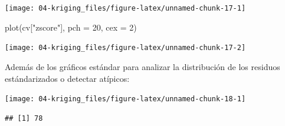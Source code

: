\documentclass[
  spanish,
]{book}
\newenvironment{Shaded}{\begin{snugshade}}{\end{snugshade}}
\newcommand{\AttributeTok}[1]{\textcolor[rgb]{0.77,0.63,0.00}{#1}}
\newcommand{\CommentTok}[1]{\textcolor[rgb]{0.56,0.35,0.01}{\textit{#1}}}
\newcommand{\ConstantTok}[1]{\textcolor[rgb]{0.00,0.00,0.00}{#1}}
\newcommand{\DecValTok}[1]{\textcolor[rgb]{0.00,0.00,0.81}{#1}}
\newcommand{\FunctionTok}[1]{\textcolor[rgb]{0.00,0.00,0.00}{#1}}
\newcommand{\NormalTok}[1]{#1}
\newcommand{\OtherTok}[1]{\textcolor[rgb]{0.56,0.35,0.01}{#1}}
\newcommand{\SpecialCharTok}[1]{\textcolor[rgb]{0.00,0.00,0.00}{#1}}
\newcommand{\StringTok}[1]{\textcolor[rgb]{0.31,0.60,0.02}{#1}}
\theoremstyle{break}
\theoremstyle{definition}
\theoremstyle{definition}
\theoremstyle{definition}
\theoremstyle{definition}
\theoremstyle{remark}
\begin{document}
\begin{center}\texttt{[image: 04-kriging\_files/figure-latex/unnamed-chunk-17-1]} \end{center}

\begin{Shaded}
\begin{Highlighting}[]
\FunctionTok{plot}\NormalTok{(cv[}\StringTok{"zscore"}\NormalTok{], }\AttributeTok{pch =} \DecValTok{20}\NormalTok{, }\AttributeTok{cex =} \DecValTok{2}\NormalTok{)}
\end{Highlighting}
\end{Shaded}

\begin{center}\texttt{[image: 04-kriging\_files/figure-latex/unnamed-chunk-17-2]} \end{center}

Además de los gráficos estándar para analizar la distribución de los residuos estándarizados o detectar atípicos:

\begin{Shaded}
\end{Shaded}

\begin{center}\texttt{[image: 04-kriging\_files/figure-latex/unnamed-chunk-18-1]} \end{center}

\begin{verbatim}
## [1] 78
\end{verbatim}
\end{document}
